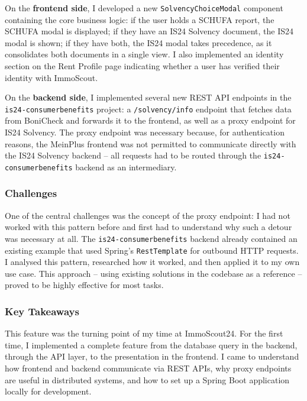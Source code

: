 \documentclass[a4paper, 12pt]{article}
\begin{document}
On the \textbf{frontend side}, I developed a new \texttt{SolvencyChoiceModal} component
containing the core business logic: if the user holds a SCHUFA report, the SCHUFA modal
is displayed; if they have an IS24 Solvency document, the IS24 modal is shown; if they
have both, the IS24 modal takes precedence, as it consolidates both documents in a
single view. I also implemented an identity section on the Rent Profile page indicating
whether a user has verified their identity with ImmoScout.

On the \textbf{backend side}, I implemented several new REST API endpoints in the
\texttt{is24-consumerbenefits} project: a \texttt{/solvency/info} endpoint that fetches
data from BoniCheck and forwards it to the frontend, as well as a proxy endpoint for
IS24 Solvency. The proxy endpoint was necessary because, for authentication reasons,
the MeinPlus frontend was not permitted to communicate directly with the IS24 Solvency
backend -- all requests had to be routed through the \texttt{is24-consumerbenefits}
backend as an intermediary.

\subsubsection*{Challenges}

One of the central challenges was the concept of the proxy endpoint: I had not worked
with this pattern before and first had to understand why such a detour was necessary at
all. The \texttt{is24-consumerbenefits} backend already contained an existing example
that used Spring's \texttt{RestTemplate} for outbound HTTP requests. I analysed this
pattern, researched how it worked, and then applied it to my own use case. This
approach -- using existing solutions in the codebase as a reference -- proved to be
highly effective for most tasks.

\subsubsection*{Key Takeaways}

This feature was the turning point of my time at ImmoScout24. For the first time, I
implemented a complete feature from the database query in the backend, through the API
layer, to the presentation in the frontend. I came to understand how frontend and
backend communicate via REST APIs, why proxy endpoints are useful in distributed
systems, and how to set up a Spring Boot application locally for development.
\end{document}
